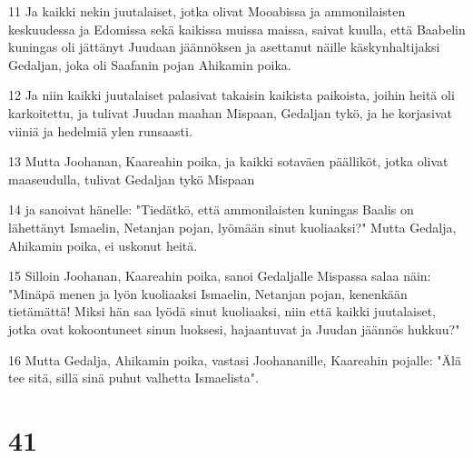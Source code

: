 \par 11 Ja kaikki nekin juutalaiset, jotka olivat Mooabissa ja ammonilaisten keskuudessa ja Edomissa sekä kaikissa muissa maissa, saivat kuulla, että Baabelin kuningas oli jättänyt Juudaan jäännöksen ja asettanut näille käskynhaltijaksi Gedaljan, joka oli Saafanin pojan Ahikamin poika.
\par 12 Ja niin kaikki juutalaiset palasivat takaisin kaikista paikoista, joihin heitä oli karkoitettu, ja tulivat Juudan maahan Mispaan, Gedaljan tykö, ja he korjasivat viiniä ja hedelmiä ylen runsaasti.
\par 13 Mutta Joohanan, Kaareahin poika, ja kaikki sotaväen päälliköt, jotka olivat maaseudulla, tulivat Gedaljan tykö Mispaan
\par 14 ja sanoivat hänelle: "Tiedätkö, että ammonilaisten kuningas Baalis on lähettänyt Ismaelin, Netanjan pojan, lyömään sinut kuoliaaksi?" Mutta Gedalja, Ahikamin poika, ei uskonut heitä.
\par 15 Silloin Joohanan, Kaareahin poika, sanoi Gedaljalle Mispassa salaa näin: "Minäpä menen ja lyön kuoliaaksi Ismaelin, Netanjan pojan, kenenkään tietämättä! Miksi hän saa lyödä sinut kuoliaaksi, niin että kaikki juutalaiset, jotka ovat kokoontuneet sinun luoksesi, hajaantuvat ja Juudan jäännös hukkuu?"
\par 16 Mutta Gedalja, Ahikamin poika, vastasi Joohananille, Kaareahin pojalle: "Älä tee sitä, sillä sinä puhut valhetta Ismaelista".

\chapter{41}

